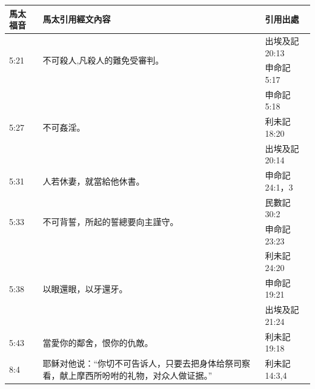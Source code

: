 \begin{table}[htbp]
  \centering
    \begin{tabular}{|p{4.2em}|p{31.645em}|p{7.3em}|}
    \toprule
    \rowcolor[rgb]{ .749,  .749,  .749} \textcolor[rgb]{ .267,  .447,  .769}{\textbf{馬太福音}} 
    & \textcolor[rgb]{ .267,  .447,  .769}{\textbf{馬太引用經文內容}} 
    & \textcolor[rgb]{ .267,  .447,  .769}{\textbf{引用出處}} \\    
  \midrule    
    \multirow{2}[4]{*}{5:21} & \multirow{2}[4]{*}{不可殺人,凡殺人的難免受審判。} & 出埃及記 20:13 \\
\cmidrule{3-3}    \multicolumn{1}{|l|}{} & \multicolumn{1}{l|}{} & 申命記 5:17 \\
    \midrule
    \multirow{3}[6]{*}{5:27} & \multirow{3}[6]{*}{不可姦淫。} & 申命記 5:18 \\
\cmidrule{3-3}    \multicolumn{1}{|l|}{} & \multicolumn{1}{l|}{} & 利未記 18:20 \\
\cmidrule{3-3}    \multicolumn{1}{|l|}{} & \multicolumn{1}{l|}{} & 出埃及記 20:14 \\
    \midrule
    5:31  & 人若休妻，就當給他休書。 & 申命記 24:1，3 \\
    \midrule
    \multicolumn{1}{|l|}{\multirow{2}[4]{*}{5:33}} & \multirow{2}[4]{*}{不可背誓，所起的誓總要向主謹守。} & 民數記 30:2 \\
\cmidrule{3-3}    \multicolumn{1}{|l|}{} & \multicolumn{1}{l|}{} & 申命記 23:23 \\
    \midrule
    \multicolumn{1}{|l|}{\multirow{3}[6]{*}{5:38}} & \multirow{3}[6]{*}{以眼還眼，以牙還牙。} & 利未記 24:20 \\
\cmidrule{3-3}    \multicolumn{1}{|l|}{} & \multicolumn{1}{l|}{} & 申命記 19:21 \\
\cmidrule{3-3}    \multicolumn{1}{|l|}{} & \multicolumn{1}{l|}{} & 出埃及記 21:24 \\
    \midrule
    \multicolumn{1}{|l|}{5:43} & 當愛你的鄰舍，恨你的仇敵。 & 利未記 19:18 \\
        \midrule
        8:4   & 耶稣对他说：“你切不可告诉人，只要去把身体给祭司察看，献上摩西所吩咐的礼物，对众人做证据。” & 利未記 14:3,4 \\    

\end{tabular}
\end{table}
